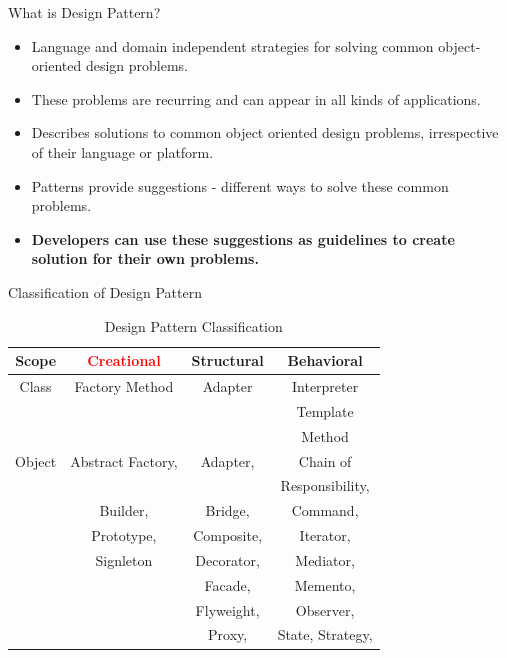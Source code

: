 \documentclass[13pt]{beamer}
\begin{document}
\begin{frame}{What is Design Pattern?}
	\begin{itemize}
	\setlength\itemsep{1em}
		\item Language and domain independent strategies for solving common object-oriented 				design problems.
		\item These problems are recurring and can appear in all kinds of applications.
		\item Describes solutions to common object oriented design problems, irrespective of 				their language or platform.
		\item Patterns provide suggestions - different ways to solve these common problems.
		\item \textbf{Developers can use these suggestions as guidelines to create solution for 			their own problems.}
	\end{itemize}
\end{frame}

\begin{frame}{Classification of Design Pattern}
\begin{table}[h!]
  \begin{center}
    \caption{Design Pattern Classification}
    \begin{tabular}{|c|c|c|c|} %
		\hline      
      	\textbf{Scope} & \textcolor{red}{\textbf{Creational}} & \textbf{Structural} & \textbf{Behavioral}\\
		\hline	  	
	  	Class & Factory Method & Adapter & Interpreter \\
	  		& 				& 		  & Template\\
	  		&				&		  & Method\\    
      	\hline
      	Object & Abstract Factory, & Adapter, & Chain of\\ 
      		 &				   & 		 & Responsibility,\\
       		 & Builder, & Bridge, & Command,\\
       		 & Prototype, & Composite, & Iterator,\\
       		 & Signleton & Decorator, & Mediator,\\
       		 & 			 & Facade, & Memento,\\
       		 &			 & Flyweight, & Observer,\\
       		 &			 & Proxy, & State, Strategy,\\
      	\hline
    \end{tabular}
  \end{center}
\end{table}
\end{frame}
\end{document}
